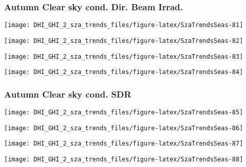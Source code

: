 \documentclass[
  10pt,
  a4paper,oneside]{article}
\begin{document}
\newpage

\hypertarget{autumn-clear-sky-cond.-dir.-beam-irrad.}{%
\subsubsection{Autumn Clear sky cond. Dir. Beam Irrad.}\label{autumn-clear-sky-cond.-dir.-beam-irrad.}}

\begin{center}\texttt{[image: DHI\_GHI\_2\_sza\_trends\_files/figure-latex/SzaTrendsSeas-81]} \end{center}

\begin{center}\texttt{[image: DHI\_GHI\_2\_sza\_trends\_files/figure-latex/SzaTrendsSeas-82]} \end{center}

\begin{center}\texttt{[image: DHI\_GHI\_2\_sza\_trends\_files/figure-latex/SzaTrendsSeas-83]} \end{center}

\begin{center}\texttt{[image: DHI\_GHI\_2\_sza\_trends\_files/figure-latex/SzaTrendsSeas-84]} \end{center}

\newpage

\hypertarget{autumn-clear-sky-cond.-sdr}{%
\subsubsection{Autumn Clear sky cond. SDR}\label{autumn-clear-sky-cond.-sdr}}

\begin{center}\texttt{[image: DHI\_GHI\_2\_sza\_trends\_files/figure-latex/SzaTrendsSeas-85]} \end{center}

\begin{center}\texttt{[image: DHI\_GHI\_2\_sza\_trends\_files/figure-latex/SzaTrendsSeas-86]} \end{center}

\begin{center}\texttt{[image: DHI\_GHI\_2\_sza\_trends\_files/figure-latex/SzaTrendsSeas-87]} \end{center}

\begin{center}\texttt{[image: DHI\_GHI\_2\_sza\_trends\_files/figure-latex/SzaTrendsSeas-88]} \end{center}
\end{document}
